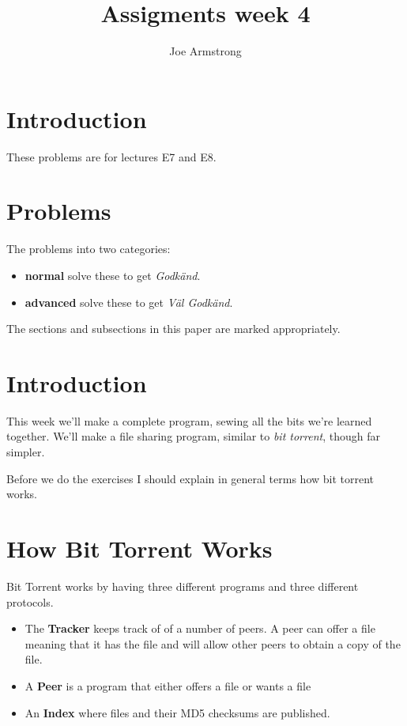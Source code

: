 \documentclass[12pt]{hitec}
\title{Assigments week 4}
\author{Joe Armstrong}
\begin{document}
\maketitle

\tableofcontents

\section{Introduction}
These problems are for lectures E7 and E8.

\section{Problems}

The problems into two categories:

\begin{itemize}
\item {\bf normal} solve these to get {\sl Godk\"{a}nd}.
\item {\bf advanced} solve these to get {\sl V\"{a}l Godk\"{a}nd}.
\end{itemize}

The sections and subsections in this paper are marked appropriately.

\section{Introduction}

This week we'll make a complete program, sewing all the bits we're learned together.
We'll make a file sharing program, similar to {\sl bit torrent}, though far simpler.

Before we do the exercises I should explain in general terms how bit torrent works.

\section*{How Bit Torrent Works}

Bit Torrent works by having three different programs and three different protocols.

\begin{itemize}

\item The {\bf Tracker} keeps  track of of a number of peers. A peer can offer a file
  meaning that it has the file and will allow other peers to obtain a copy of the file.
\item A {\bf Peer} is a program that either offers a file or wants a file
\item An {\bf Index} where files and their MD5 checksums are published.
  
\end{itemize}
\end{document}
